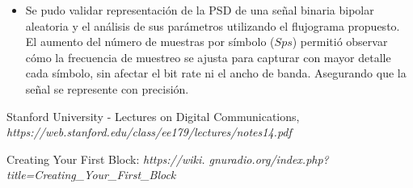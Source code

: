 \documentclass{journal}[IEEEtran, twocolumn]             %
\begin{document}
\begin{multicols}{2}
\begin{itemize}
    
    \item Se pudo validar representación de la PSD de una señal binaria bipolar aleatoria y el análisis de sus parámetros utilizando el flujograma propuesto. El aumento del número de muestras por símbolo ($Sps$) permitió observar cómo la frecuencia de muestreo se ajusta para capturar con mayor detalle cada símbolo, sin afectar el bit rate ni el ancho de banda. Asegurando que la señal se represente con precisión.
    
     
\end{itemize}

\begin{thebibliography}{1}

Stanford University - Lectures on Digital Communications, \textit{https://web.stanford.edu/class/ee179/lectures/notes14.pdf}

Creating Your First Block:  \textit{https://wiki.
gnuradio.org/index.php?title=Creating_Your_First_Block}

\end{thebibliography}

\end{multicols}
\end{document}
